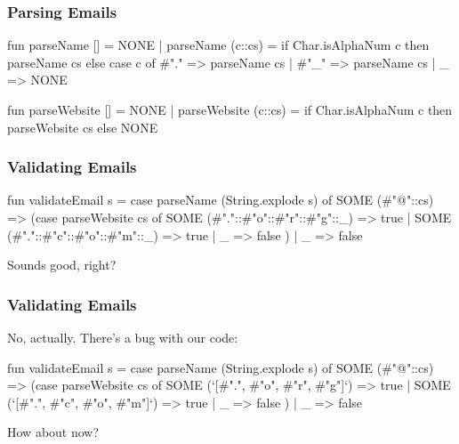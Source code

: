 \documentclass[aspectratio=169]{beamer}
\begin{document}
\begin{frame}[fragile]
  \frametitle{Parsing Emails}

  \small
  \begin{codeblock}
    fun parseName [] = NONE
      | parseName (c::cs) =
          if Char.isAlphaNum c then
            parseName cs 
          else
            case c of
              #"." => parseName cs
            | #"_" => parseName cs
            | _ => NONE 
  \end{codeblock}

  \begin{codeblock}
    fun parseWebsite [] = NONE
      | parseWebsite (c::cs) =
          if Char.isAlphaNum c then
            parseWebsite cs 
          else
            NONE
  \end{codeblock}
\end{frame}

\begin{frame}[fragile]
  \frametitle{Validating Emails}

  \begin{codeblock}
    fun validateEmail s = 
      case parseName (String.explode s) of
        SOME (#"@"::cs) =>
          (case parseWebsite cs of
            SOME (#"."::#"o"::#"r"::#"g"::_) => true
          | SOME (#"."::#"c"::#"o"::#"m"::_) => true
          | _ => false
          )
      | _ => false 
  \end{codeblock}

  Sounds good, right?
\end{frame}

\begin{frame}[fragile]
  \frametitle{Validating Emails}

  No, actually. There's a bug with our code: 

  \begin{codeblock}
    fun validateEmail s = 
      case parseName (String.explode s) of
        SOME (#"@"::cs) =>
          (case parseWebsite cs of
            SOME (`[#".", #"o", #"r", #"g"]`) => true
          | SOME (`[#".", #"c", #"o", #"m"]`) => true
          | _ => false
          )
      | _ => false 
  \end{codeblock}

  How about now?
\end{frame}
\end{document}
